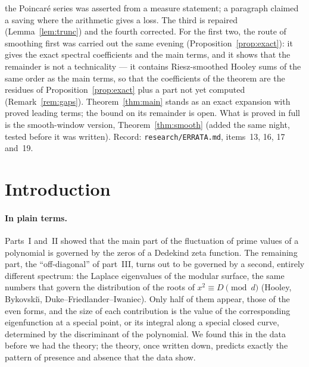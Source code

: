 \documentclass[11pt,a4paper]{article}
\theoremstyle{remark}\newtheorem{remark}[theorem]{Remark}
\begin{document}
{{the Poincar\'e series was asserted from a measure statement; a paragraph claimed a saving where the arithmetic gives a
loss. The third is repaired (Lemma~\ref{lem:trunc}) and the fourth corrected. For the first two, the route of smoothing
first was carried out the same evening (Proposition~\ref{prop:exact}): it gives the exact spectral coefficients and the
main terms, and it shows that the remainder is not a technicality --- it contains Riesz-smoothed Hooley sums of the same
order as the main terms, so that the coefficients of the theorem are the residues of Proposition~\ref{prop:exact} plus a
part not yet computed (Remark~\ref{rem:gaps}). Theorem~\ref{thm:main} stands as an exact expansion with proved leading
terms; the bound on its remainder is open. What is proved in full is the smooth-window version,
Theorem~\ref{thm:smooth} (added the same night, tested before it was written). Record: \texttt{research/ERRATA.md},
items~13, 16, 17 and~19.}}

\section{Introduction}\label{sec:intro}

\paragraph{In plain terms.} Parts~I and~II showed that the main part of the fluctuation of prime values of a
polynomial is governed by the zeros of a Dedekind zeta function. The remaining part, the ``off-diagonal'' of
part~III, turns out to be governed by a second, entirely different spectrum: the Laplace eigenvalues of the
modular surface, the same numbers that govern the distribution of the roots of $x^2\equiv D\pmod d$ (Hooley,
Bykovski\u\i, Duke--Friedlander--Iwaniec). Only half of them appear, those of the even forms, and the size of each
contribution is the value of the corresponding eigenfunction at a special point, or its integral along a special
closed curve, determined by the discriminant of the polynomial. We found this in the data before we had the
theory; the theory, once written down, predicts exactly the pattern of presence and absence that the data show.
\end{document}
